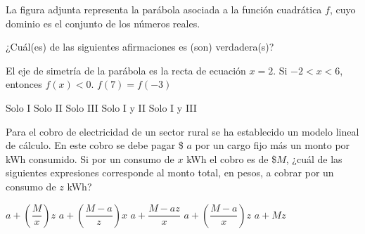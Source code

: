 \documentclass[
  titulo=Prueba,
  subtitulo=Álgebra y funciones,
  curso=Tercero medio A,
  fecha=2025-09-23,
  con nombre,
  ppp=1
]{srs3}
\begin{document}
\begin{preguntas}
\pregunta La figura adjunta representa la parábola asociada a la función cuadrática \(f\), cuyo dominio es el conjunto de los números reales.
\begin{columnas}
¿Cuál(es) de las siguientes afirmaciones es (son) verdadera(s)?
\begin{opciones}
\opcion El eje de simetría de la parábola es la recta de ecuación \( x=2 \).
\opcion Si \(-2 < x < 6\), entonces \(f\left(x\right)<0\).
\opcion \( f\left(7\right) = f\left(-3\right) \)
\end{opciones}
\begin{alternativas}
\alternativa Solo I
\alternativa Solo II
\alternativa Solo III
\alternativa Solo I y II
\alternativa Solo I y III
\end{alternativas}
\siguiente
{}
\end{columnas}

\pregunta Para el cobro de electricidad de un sector rural se ha establecido un modelo lineal de cálculo. En este cobro se debe pagar \$ \(a\) por un cargo fijo más un monto por kWh consumido. Si por un consumo de \(x\) kWh el cobro es de \$\(M\), ¿cuál de las siguientes expresiones corresponde al monto total, en pesos, a cobrar por un consumo de \(z\) kWh?
\begin{alternativas}
\alternativa \(a + \left(\dfrac{M}{x}\right)z\)
\alternativa \(a + \left(\dfrac{M-a}{z}\right)x\)
\alternativa \(a + \dfrac{M-az}{x}\)
\alternativa \(a + \left(\dfrac{M-a}{x}\right)z\)
\alternativa \(a + Mz\)
\end{alternativas}


\end{preguntas}
\end{document}
